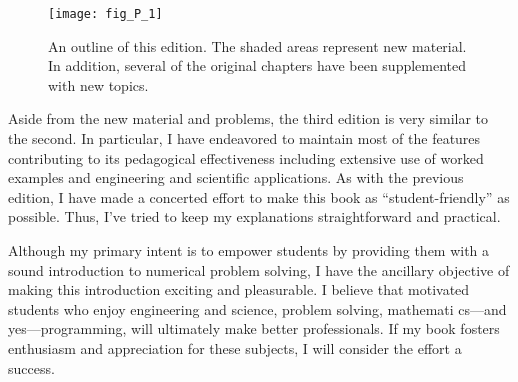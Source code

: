 \documentclass[../main.tex]{subfiles}
\begin{document}
\begin{figure}[H]
	\centering
	\texttt{[image: fig\_P\_1]}
	\caption{\textsf{An outline of this edition. The shaded areas represent new material. In addition, several of the original chapters have been supplemented with
new topics.}}
	\label{fig:fig_P_1}
\end{figure}


Aside from the new material and problems, the third edition is very similar to the second.
In particular, I have endeavored to maintain most of the features contributing to its pedagogical effectiveness including extensive use of worked examples and engineering and scientific applications. As with the previous edition, I have made a concerted effort to make this
book as “student-friendly” as possible. Thus, I’ve tried to keep my explanations straightforward and practical.

Although my primary intent is to empower students by providing them with a sound
introduction to numerical problem solving, I have the ancillary objective of making this
introduction exciting and pleasurable. I believe that motivated students who enjoy engineering and science, problem solving, mathemati cs—and yes—programming, will ultimately make better professionals. If my book fosters enthusiasm and appreciation for these
subjects, I will consider the effort a success.
\end{document}
